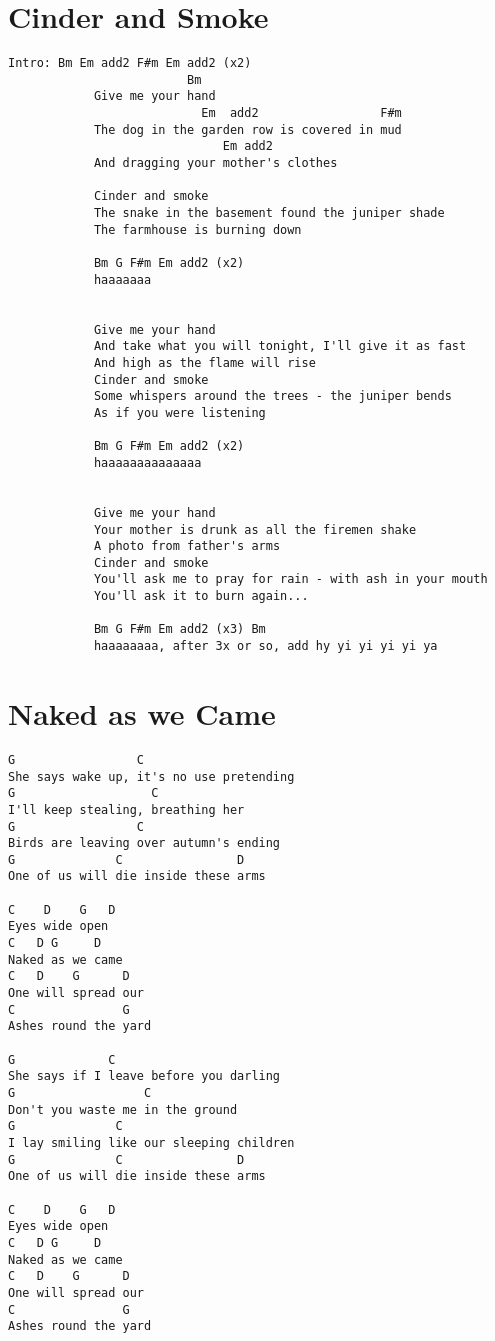 \documentclass[leqno]{memoir}
\begin{document}
\chapter{Cinder and Smoke}
\begin{verbatim}
Intro: Bm Em add2 F#m Em add2 (x2)
                         Bm
            Give me your hand
                           Em  add2                 F#m
            The dog in the garden row is covered in mud
                              Em add2
            And dragging your mother's clothes

            Cinder and smoke
            The snake in the basement found the juniper shade
            The farmhouse is burning down
       
            Bm G F#m Em add2 (x2)
            haaaaaaa


            Give me your hand
            And take what you will tonight, I'll give it as fast
            And high as the flame will rise
            Cinder and smoke
            Some whispers around the trees - the juniper bends
            As if you were listening
            
            Bm G F#m Em add2 (x2)
            haaaaaaaaaaaaaa


            Give me your hand
            Your mother is drunk as all the firemen shake
            A photo from father's arms
            Cinder and smoke
            You'll ask me to pray for rain - with ash in your mouth
            You'll ask it to burn again...

            Bm G F#m Em add2 (x3) Bm
            haaaaaaaa, after 3x or so, add hy yi yi yi yi ya
\end{verbatim}
\newpage

\chapter{Naked as we Came}
\begin{verbatim}
G                 C
She says wake up, it's no use pretending
G                   C   
I'll keep stealing, breathing her
G                 C 
Birds are leaving over autumn's ending
G              C                D
One of us will die inside these arms

C    D    G   D
Eyes wide open
C   D G     D 
Naked as we came
C   D    G      D
One will spread our
C               G  
Ashes round the yard

G             C
She says if I leave before you darling
G                  C
Don't you waste me in the ground
G              C
I lay smiling like our sleeping children
G              C                D
One of us will die inside these arms

C    D    G   D
Eyes wide open
C   D G     D 
Naked as we came
C   D    G      D
One will spread our
C               G  
Ashes round the yard
\end{verbatim}
\newpage
\end{document}
